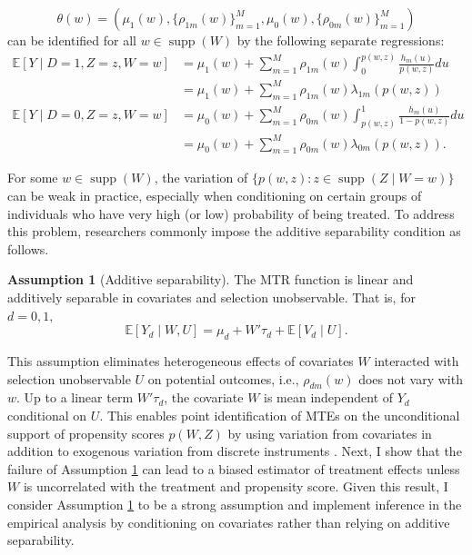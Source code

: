 \documentclass[11pt]{article}
\theoremstyle{definition}
\newtheorem{assumption}{Assumption}
\DeclareMathOperator*{\supp}{supp}
\newcommand{\Exp}{\ensuremath{\mathbb{E}}} %
\newcommand{\0}{\ensuremath{\mathbf{0}}}
\begin{document}
\begin{bibunit}
\[
    \theta(w) = (\mu_1(w), \{\rho_{1m}(w)\}_{m=1}^M, \mu_0(w),\{\rho_{0m}(w)\}_{m=1}^M)
\]
can be identified for all $w\in\supp(W)$ by the following separate regressions:
\begin{equation}
\label{eq:separate_reg}
\begin{aligned}
	\Exp[Y\mid D=1, Z=z, W=w]  
	& = \mu_1(w) + \sum_{m=1}^M \rho_{1m}(w) {\int_0^{p(w,z)} \frac{h_m(u)}{p(w,z)} du} \\
	& =  \mu_1(w) + \sum_{m=1}^M \rho_{1m}(w) \lambda_{1m}(p(w,z))\\
	\Exp[Y\mid D=0, Z=z, W=w] 
	&= \mu_0(w) + \sum_{m=1}^M \rho_{0m}(w) {\int_{p(w,z)}^1 \frac{h_m(u)}{1-p(w,z)} du} \\
	& = \mu_0(w) + \sum_{m=1}^M \rho_{0m}(w) \lambda_{0m}(p(w,z)). 
\end{aligned}
\end{equation}

For some $w\in \supp(W)$, the variation of $\{p(w,z): z\in\supp(Z\mid W=w)\}$ can be weak in practice, especially when conditioning on certain groups of individuals who have very high (or low) probability of being treated. 
To address this problem, researchers commonly impose the additive separability condition as follows.
\begin{assumption}[Additive separability]
    \label{asp:add_sep}
    The MTR function is linear and additively separable in covariates and selection unobservable. That is, for $d = 0,1,$
    \[
        \Exp[Y_d\mid W, U] = \mu_d + W'\tau_d + \Exp[V_d\mid U].
    \]
\end{assumption}
This assumption eliminates heterogeneous effects of covariates $W$ interacted with selection unobservable $U$ on potential outcomes, i.e., $\rho_{dm}(w)$ does not vary with $w$. Up to a linear term $W'\tau_d$, the covariate $W$ is mean independent of $Y_d$ conditional on $U$. This enables point identification of MTEs on the unconditional support of propensity scores $p(W,Z)$ by using variation from covariates in addition to exogenous variation from discrete instruments \citep[Section I.B]{carneiro/heckman/vytlacil:2011}. Next, I show that the failure of Assumption \ref{asp:add_sep} can lead to a biased estimator of treatment effects unless $W$ is uncorrelated with the treatment and propensity score. Given this result, I consider Assumption \ref{asp:add_sep} to be a strong assumption and implement inference in the empirical analysis by conditioning on covariates rather than relying on additive separability.


\end{bibunit}
\end{document}

